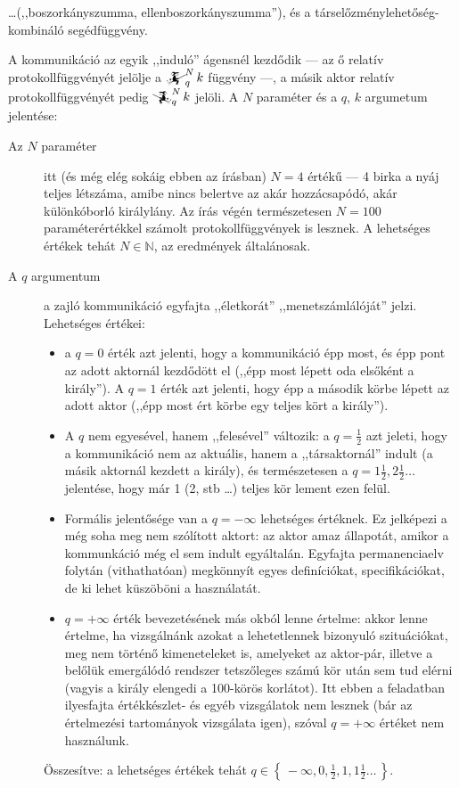 \documentclass{article}
\newcommand{\setOf}[1]{\left\lbrace\,#1\,\right\rbrace}
\newcommand{\mainfunA}[3]{\mathwitch_{#2}^{#1}#3}
\newcommand{\mainfunB}[3]{\reversemathwitch_{#2}^{#1}#3}
\begin{document}
	 \dots (,,boszorkányszumma, ellenboszorkányszumma''), és a társelőzménylehetőség-kombináló segédfüggvény.


	A kommunikáció az egyik ,,induló'' ágensnél kezdődik --- az ő relatív protokollfüggvényét jelölje a $\mainfunA Nqk$ függvény ---, a másik aktor relatív protokollfüggvényét pedig  $\mainfunB Nqk$ jelöli. A $N$ paraméter és a $q$, $k$ argumetum jelentése:

	\begin{description}
		\item[Az $N$ paraméter] itt (és még elég sokáig ebben az írásban) $N=4$ értékű --- 4 birka a nyáj teljes létszáma, amibe nincs belertve az akár hozzácsapódó, akár különkóborló királylány.
		Az írás végén természetesen $N=100$ paraméterértékkel számolt protokollfüggvények is lesznek.
		A lehetséges értékek tehát $N \in \mathbb N$, az eredmények általánosak.

		\item[A $q$ argumentum] a zajló kommunikáció egyfajta ,,életkorát'' ,,menetszámlálóját'' jelzi.
		Lehetséges értékei:
		\begin{itemize}
			\item a $q = 0$ érték azt jelenti, hogy a kommunikáció épp most, és épp pont az adott aktornál kezdődött el (,,épp most lépett oda elsőként a király''). A $q = 1$ érték azt jelenti, hogy épp a második körbe lépett az adott aktor (,,épp most ért körbe egy teljes kört a király'').
			\item A $q$ nem egyesével, hanem ,,felesével'' változik: a $q = \frac12$ azt jeleti, hogy a kommunikáció nem az aktuális, hanem a ,,társaktornál'' indult (a másik aktornál kezdett a király), és természetesen a $q = 1\frac12, 2\frac12 \dots$ jelentése, hogy már 1 (2, stb \dots) teljes kör lement ezen felül.
			\item Formális jelentősége van a $q = -\infty$ lehetséges értéknek. Ez jelképezi a még soha meg nem szólított aktort: az aktor amaz állapotát, amikor a kommunkáció még el sem indult egyáltalán. Egyfajta permanenciaelv folytán (vithathatóan) megkönnyít egyes definíciókat, specifikációkat, de ki lehet küszöböni a használatát.
			\item $q = +\infty$ érték bevezetésének más okból lenne értelme: akkor lenne értelme, ha vizsgálnánk azokat a lehetetlennek bizonyuló szituációkat, meg nem történő kimeneteleket is, amelyeket az aktor-pár, illetve a belőlük emergálódó rendszer tetszőleges számú kör után sem tud elérni (vagyis a király elengedi a 100-körös korlátot). Itt ebben a feladatban ilyesfajta értékkészlet- és egyéb vizsgálatok nem lesznek (bár az értelmezési tartományok vizsgálata igen), szóval $q = +\infty$ értéket nem használunk.
		\end{itemize}
		Összesítve: a lehetséges értékek tehát $q \in \setOf{-\infty, 0, \frac12, 1, 1\frac12\dots}$.


\end{description}
\end{document}
